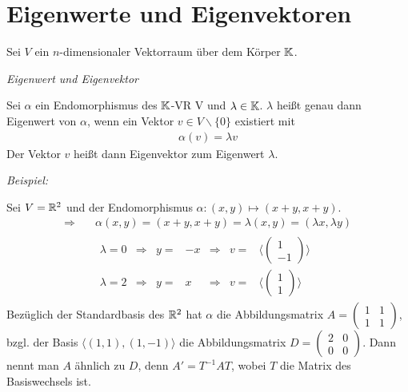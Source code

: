 \section{Eigenwerte und Eigenvektoren}

Sei $V$ ein $n$-dimensionaler Vektorraum über dem Körper $\mathbb{K}$.

\begin{mydef} \textit{Eigenwert und Eigenvektor}

    Sei $\alpha$ ein Endomorphismus des $\mathbb{K}$-VR V und $\lambda\in \mathbb{K}$. $\lambda$ heißt genau dann Eigenwert von $\alpha$, wenn ein Vektor $v\in 
    V\backslash\lbrace0\rbrace$ existiert mit
    \begin{align*}
        \alpha(v) = \lambda v
    \end{align*}
    Der Vektor $v$ heißt dann Eigenvektor zum Eigenwert $\lambda$.
\end{mydef}

\textit{Beispiel:}

Sei $V=\mathbb{R}^2$ und der Endomorphismus $\alpha:(x,y)\mapsto (x+y,x+y)$.
\begin{align*}
    \Rightarrow \quad & \alpha(x,y)=(x+y,x+y) = \lambda(x,y)=(\lambda x,\lambda y)\\
    & \begin{array}{cccrccc}
        \lambda=0 & \Rightarrow & y= & -x & \Rightarrow & v= &\langle \begin{pmatrix}1\\-1\end{pmatrix} \rangle \\
        \lambda=2 & \Rightarrow & y= &  x & \Rightarrow & v= &\langle \begin{pmatrix}1\\ 1\end{pmatrix} \rangle
    \end{array}
\end{align*}
Bezüglich der Standardbasis des $\mathbb{R}^2$ hat $\alpha$ die Abbildungsmatrix $A=\begin{pmatrix}1&1\\1&1\end{pmatrix}$, bzgl. der Basis $\langle(1,1),(1,-1)\rangle$ die
Abbildungsmatrix $D=\begin{pmatrix}2&0\\0&0\end{pmatrix}$. Dann nennt man $A$ ähnlich zu $D$, denn $A'=T^{-1}AT$, wobei $T$ die Matrix des Basiswechsels ist.\\


